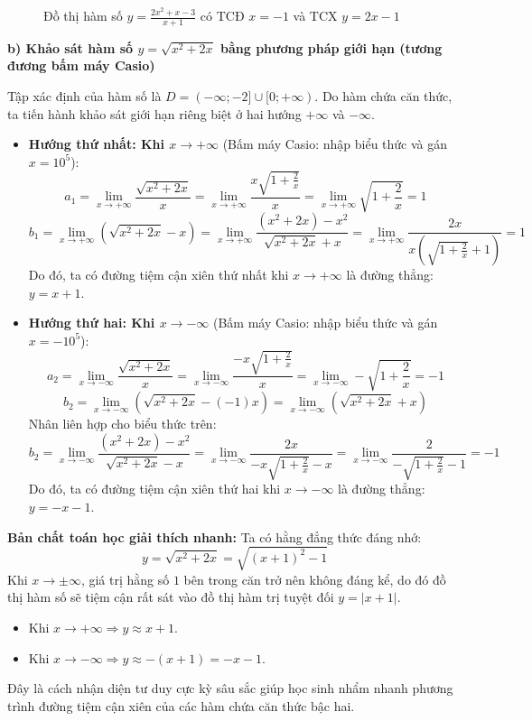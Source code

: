\documentclass[12pt]{article}
\begin{document}
\begin{loigiai}
\begin{figure}[H]
			\caption{Đồ thị hàm số $y = \frac{2x^2 + x - 3}{x + 1}$ có TCĐ $x = -1$ và TCX $y = 2x - 1$}
		\end{figure}
		
		\textbf{b) Khảo sát hàm số $y = \sqrt{x^2 + 2x}$ bằng phương pháp giới hạn (tương đương bấm máy Casio)}
		
		Tập xác định của hàm số là $D = (-\infty; -2] \cup [0; +\infty)$. Do hàm chứa căn thức, ta tiến hành khảo sát giới hạn riêng biệt ở hai hướng $+\infty$ và $-\infty$.
		
		\begin{itemize}
			\item \textbf{Hướng thứ nhất: Khi $x \to +\infty$} (Bấm máy Casio: nhập biểu thức và gán $x = 10^5$):
			\[ a_1 = \lim_{x \to +\infty} \frac{\sqrt{x^2 + 2x}}{x} = \lim_{x \to +\infty} \frac{x\sqrt{1 + \frac{2}{x}}}{x} = \lim_{x \to +\infty} \sqrt{1 + \frac{2}{x}} = 1 \]
			\[ b_1 = \lim_{x \to +\infty} \left( \sqrt{x^2 + 2x} - x \right) = \lim_{x \to +\infty} \frac{(x^2 + 2x) - x^2}{\sqrt{x^2 + 2x} + x} = \lim_{x \to +\infty} \frac{2x}{x\left( \sqrt{1 + \frac{2}{x}} + 1 \right)} = 1 \]
			Do đó, ta có đường tiệm cận xiên thứ nhất khi $x \to +\infty$ là đường thẳng: $y = x + 1$.
			
			\item \textbf{Hướng thứ hai: Khi $x \to -\infty$} (Bấm máy Casio: nhập biểu thức và gán $x = -10^5$):
			\[ a_2 = \lim_{x \to -\infty} \frac{\sqrt{x^2 + 2x}}{x} = \lim_{x \to -\infty} \frac{-x\sqrt{1 + \frac{2}{x}}}{x} = \lim_{x \to -\infty} -\sqrt{1 + \frac{2}{x}} = -1 \]
			\[ b_2 = \lim_{x \to -\infty} \left( \sqrt{x^2 + 2x} - (-1)x \right) = \lim_{x \to -\infty} \left( \sqrt{x^2 + 2x} + x \right) \]
			Nhân liên hợp cho biểu thức trên:
			\[ b_2 = \lim_{x \to -\infty} \frac{(x^2 + 2x) - x^2}{\sqrt{x^2 + 2x} - x} = \lim_{x \to -\infty} \frac{2x}{-x\sqrt{1 + \frac{2}{x}} - x} = \lim_{x \to -\infty} \frac{2}{-\sqrt{1 + \frac{2}{x}} - 1} = -1 \]
			Do đó, ta có đường tiệm cận xiên thứ hai khi $x \to -\infty$ là đường thẳng: $y = -x - 1$.
		\end{itemize}
		
		\textbf{Bản chất toán học giải thích nhanh:} Ta có hằng đẳng thức đáng nhớ:
		\[ y = \sqrt{x^2 + 2x} = \sqrt{(x + 1)^2 - 1} \]
		Khi $x \to \pm\infty$, giá trị hằng số $1$ bên trong căn trở nên không đáng kể, do đó đồ thị hàm số sẽ tiệm cận rất sát vào đồ thị hàm trị tuyệt đối $y = |x + 1|$. 
		\begin{itemize}
			\item Khi $x \to +\infty \Rightarrow y \approx x + 1$.
			\item Khi $x \to -\infty \Rightarrow y \approx -(x + 1) = -x - 1$.
		\end{itemize}
		Đây là cách nhận diện tư duy cực kỳ sâu sắc giúp học sinh nhẩm nhanh phương trình đường tiệm cận xiên của các hàm chứa căn thức bậc hai.
	\end{loigiai}
	
\end{document}
